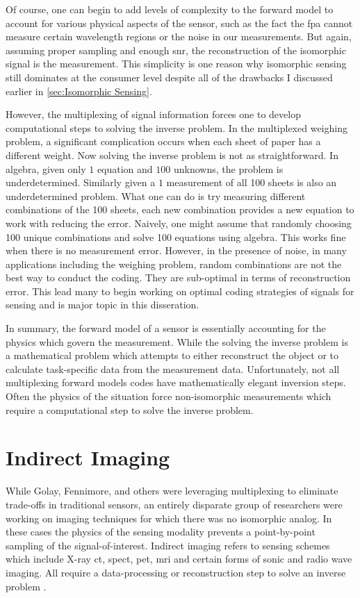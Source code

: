 Of course, one can begin to add levels of complexity to the forward model to account for various physical aspects of the sensor, such as the fact the \gls{fpa} cannot measure certain wavelength regions or the noise in our measurements. But again, assuming proper sampling and enough \gls{snr}, the reconstruction of the isomorphic signal is the measurement. This simplicity is one reason why isomorphic sensing still dominates at the consumer level despite all of the drawbacks I discussed earlier in \autoref{sec:Isomorphic Sensing}. 

However, the multiplexing of signal information forces one to develop computational steps to solving the inverse problem. In the multiplexed weighing problem, a significant complication occurs when each sheet of paper has a different weight. Now solving the inverse problem is not as straightforward. 
In algebra, given only $1$ equation and $100$ unknowns, the problem is underdetermined. Similarly given a $1$ measurement of all 100 sheets is also an underdetermined problem. What one can do is try measuring different combinations of the 100 sheets, each new combination provides a new equation to work with reducing the error. Naively, one might assume that randomly choosing 100 unique combinations and solve 100 equations using algebra. This works fine when there is no measurement error. However, in the presence of noise, in many applications including the weighing problem, random combinations are not the best way to conduct the coding. They are sub-optimal in terms of reconstruction error. This lead many to begin working on optimal coding strategies of signals for sensing and is major topic in this disseration.

In summary, the forward model of a sensor is essentially accounting for the physics which govern the measurement. While the solving the inverse problem is a mathematical problem which attempts to either reconstruct the object or to calculate task-specific data from the measurement data. Unfortunately, not all multiplexing forward models codes have mathematically elegant inversion steps. Often the physics of the situation force non-isomorphic measurements which require a computational step to solve the inverse problem. 

\section{Indirect Imaging}

While Golay, Fennimore, and others were leveraging multiplexing to eliminate trade-offs in traditional sensors, an entirely disparate group of researchers were working on imaging techniques for which there was no isomorphic analog. In these cases the physics of the sensing modality prevents a point-by-point sampling of the signal-of-interest. Indirect imaging refers to sensing schemes which include X-ray \gls{ct}, \gls{spect}, \gls{pet}, \gls{mri} and certain forms of sonic and radio wave imaging. All require a data-processing or reconstruction step to solve an inverse problem \cite{barrett2013foundations}. 

